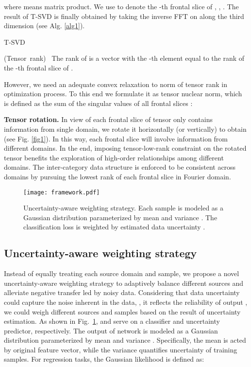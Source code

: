 \documentclass[10pt,twocolumn,letterpaper]{article}
\begin{document}
where  means matrix product. We use  to denote the -th frontal slice of , \ie, . The result of T-SVD is finally obtained by taking the inverse FFT on  along the third dimension (see Alg. \ref{alg1}).

\begin{algorithm}[!t]
	\caption{T-SVD}\label{alg1}
	\Input{\;}
	\Output{, ,  \;}
	\;
	\For{}{\;}
	 \;
\end{algorithm}

\begin{definition}
	(Tensor~rank)~\cite{kilmer2013third,lu2019tensor} The rank of  is a vector  with the -th element equal to the rank of the -th frontal slice of . 
\end{definition}

However, we need an adequate convex relaxation to  norm of tensor rank in optimization process. To this end we formulate it as tensor nuclear norm, which is defined as the sum of the singular values of all frontal slices :

\textbf{Tensor rotation.} In view of each frontal slice  of tensor  only contains information from single domain, we rotate it horizontally (or vertically) to obtain  (see Fig. \ref{fig1}). In this way, each frontal slice  will involve information from different domains. In the end, imposing tensor-low-rank constraint on the rotated tensor  benefits the exploration of high-order relationships among different domains. The inter-category data structure is enforced to be consistent across domains by pursuing the lowest rank of each frontal slice  in Fourier domain.
\begin{figure}
	\centering
	\texttt{[image: framework.pdf]}\\
	\caption{Uncertainty-aware weighting strategy. Each sample is modeled as a Gaussian distribution parameterized by mean  and variance . The classification loss is weighted by estimated data uncertainty .}
	\label{fig2}
\vspace{-1em}
\end{figure}
\subsection{Uncertainty-aware weighting strategy}
\label{sec3.3}
Instead of equally treating each source domain and sample, we propose a novel uncertainty-aware weighting strategy to adaptively balance different sources and alleviate negative transfer led by noisy data. Considering that data uncertainty could capture the noise inherent in the data, \ie, it reflects the reliability of output \cite{kendall2017what,chang2020data}, we could weigh different sources and samples based on the result of uncertainty estimation. As shown in Fig.~\ref{fig2},  and  serve on a classifier and uncertainty predictor, respectively. The output of network is modeled as a Gaussian distribution parameterized by mean  and variance . Specifically, the mean is acted by original feature vector, while the variance quantifies uncertainty of training samples. For regression tasks, the Gaussian likelihood is defined as:
\end{document}
